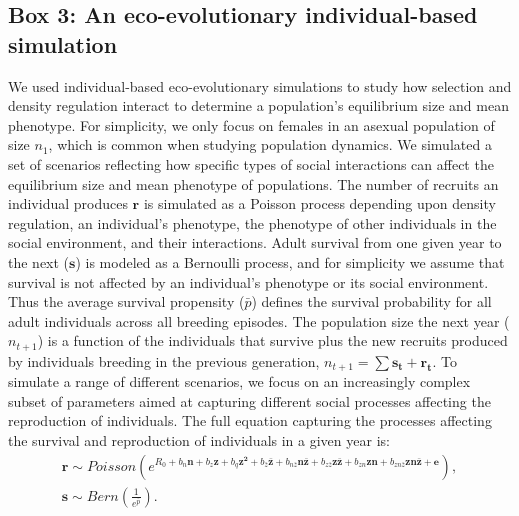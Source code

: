 \documentclass{article}
\begin{document}
\subsection{Box 3: An eco-evolutionary individual-based simulation}
We used individual-based eco-evolutionary simulations to study how selection and density regulation interact to determine a population's equilibrium size and mean phenotype. For simplicity, we only focus on females in an asexual population of size $n_{1}$, which is common when studying population dynamics. We simulated a set of scenarios reflecting how specific types of social interactions can affect the equilibrium size and mean phenotype of populations. The number of recruits an individual produces $\bm{r}$ is simulated as a Poisson process depending upon density regulation, an individual's phenotype, the phenotype of other individuals in the social environment, and their interactions. Adult survival from one given year to the next ($\bm{s}$) is modeled as a Bernoulli process, and for simplicity we assume that survival is not affected by an individual's phenotype or its social environment. Thus the average survival propensity ($\bar{p}$) defines the survival probability for all adult individuals across all breeding episodes. The population size the next year ($n_{t+1}$) is a function of the individuals that survive plus the new recruits produced by individuals breeding in the previous generation, $n_{t+1}=\sum \bm{s_{t}} + \bm{r_{t}}$. To simulate a range of different scenarios, we focus on an increasingly complex subset of parameters aimed at capturing different social processes affecting the reproduction of individuals. The full equation capturing the processes affecting the survival and reproduction of individuals in a given year is:
\begin{subequations} 
	\begin{gather}
	\bm{r}\sim Poisson(e^{R_{0} + b_{n} \bm{n} + b_{z} \bm{z} + b_{q} \bm{z^2} + b_{\bar{z}} \bm{\bar{z}} + b_{n \bar{z}} \bm{n\bar{z}} + b_{z\bar{z}}  \bm{z\bar{z}} + b_{zn}  \bm{zn} + b_{zn \bar{z}} \bm{zn\bar{z}}+  \bm{e}}), \label{eq:Full1a} \\
	\bm{s}\sim Bern(\frac{1}{e^{\bar{p}}}). \label{eq:Full1b}
	\end{gather}
\end{subequations}
\end{document}
